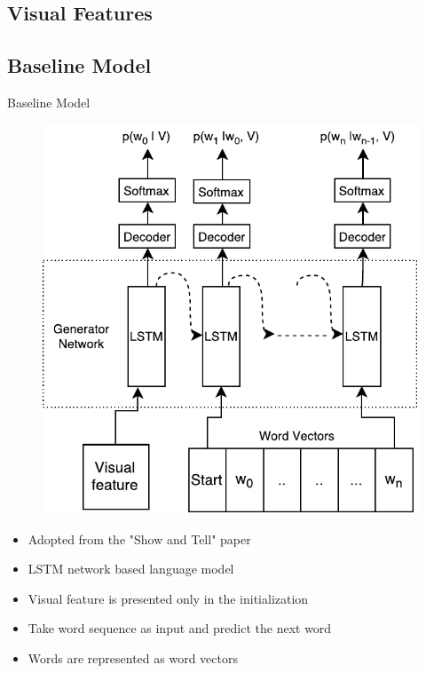 \documentclass{beamer}
\begin{document}
\subsection{Visual Features}
\subsection{Baseline Model}
\begin{frame}{Baseline Model}
    \begin{figure}[h]
        \centering
        \includegraphics[width=0.4\linewidth]{images/Thesis_lstmLangGen.pdf}
    \end{figure}
    \begin{itemize}
        \item Adopted from the "Show and Tell" paper~\cite{Vinyals_2015_CVPR} 
        \item LSTM network based language model
        \item Visual feature is presented only in the initialization 
        \item Take word sequence as input and predict the next word
        \item Words are represented as word vectors 
    \end{itemize}
\end{frame}
\end{document}
